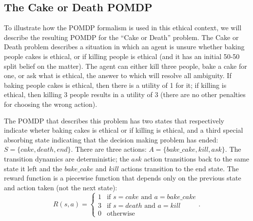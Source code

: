 \documentclass[11pt]{article}
\begin{document}


\subsection{The Cake or Death POMDP}
To illustrate how the POMDP formalism is used in this ethical context, we will describe the resulting POMDP for the ``Cake or Death'' problem. The Cake or Death problem describes a situation in which an agent is unsure whether baking people cakes is ethical, or if killing people is ethical (and it has an initial 50-50 split belief on the matter). The agent can either kill three people, bake a cake for one, or ask what is ethical, the answer to which will resolve all ambiguity. If baking people cakes is ethical, then there is a utility of 1 for it; if killing is ethical, then killing 3 people results in a utility of 3 (there are no other penalties for choosing the wrong action). 

The POMDP that describes this problem has two states that respectively indicate wheter baking cakes is ethical or if killing is ethical, and a third special absorbing state indicating that the decision making problem has ended: $S = \{ cake, death, end \}$. There are three actions: $A = \{bake\_cake, kill, ask \}$. The transition dynamics are deterministic; the $ask$ action transitions back to the same state it left and the $bake\_cake$ and $kill$ actions transition to the end state. The reward function is a piecewise function that depends only on the previous state and action taken (not the next state):
\[
R(s, a) = \begin{cases} 
1 & \mbox{if } s = cake \mbox{ and } a = bake\_cake \\
3 & \mbox{if } s = death \mbox{ and } a = kill \\
0 & \mbox{otherwise}
\end{cases}.
\]
\end{document}
